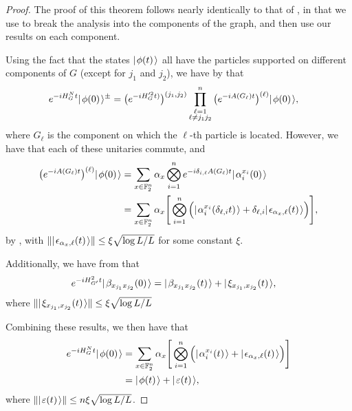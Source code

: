 \documentclass[../thesis-main/thesis-main]{subfiles}
\begin{document}
\begin{proof}
  The proof of this theorem follows nearly identically to that of , in that we use  to break the analysis into the components of the graph, and then use our results on each component.

Using the fact that the states $|\mspace{2mu} \phi(t) \mspace{2mu} \rangle$ all have the particles supported on different components of $G$ (except for $j_1$ and $j_2$), we have  by  that
  \begin{align}
    e^{-i H_G^N t} |\mspace{2mu} \phi(0) \mspace{2mu} \rangle^\pm &= \big( e^{-i H_G'^2 t)}\big)^{(j_1,j_2)}\prod_{\substack{\ell=1\\\ell\neq j_1j_2}}^n \big( e^{-i A(G_\ell)t}\big)^{(\ell)} |\mspace{2mu} \phi(0) \mspace{2mu} \rangle,
  \end{align}
where $G_\ell$ is the component on which the $\ell$-th particle is located.  However, we have that each of these unitaries commute, and
  \begin{align}
    \big( e^{-i A(G_\ell)t}\big)^{(\ell)} |\mspace{2mu} \phi(0) \mspace{2mu} \rangle&= \sum_{x\in \mathbb{F}_2^n} \alpha_x \bigotimes_{i=1}^n e^{- i \delta_{i,\ell} A(G_\ell) t} |\mspace{2mu} \alpha_i^{x_i}(0) \mspace{2mu} \rangle\\
    & = \sum_{x\in \mathbb{F}_2^n} \alpha_x \Bigg[\bigotimes_{i=1}^n \Big(|\mspace{2mu} \alpha_i^{x_i}(\delta_{\ell,i} t) \mspace{2mu} \rangle + \delta_{\ell,i} |\mspace{2mu} \epsilon_{\alpha_x,\ell}(t) \mspace{2mu} \rangle\Big)\Bigg],
  \end{align}
  by , with $\Vert |\mspace{2mu} \epsilon_{\alpha_x,\ell}(t) \mspace{2mu} \rangle\Vert \leq \xi \sqrt{\log L/L}$ for some constant $\xi$.  
  
  Additionally, we have from  that
  \begin{align}
    e^{-i H_{G'}^2 t }|\mspace{2mu} \beta_{x_{j_1}x_{j_2}}(0) \mspace{2mu} \rangle &= |\mspace{2mu} \beta_{x_{j_1}x_{j_2}}(t) \mspace{2mu} \rangle + |\mspace{2mu} \xi_{x_{j_1},x_{j_2}}(t) \mspace{2mu} \rangle,
  \end{align}
  where $\Vert  |\mspace{2mu} \xi_{x_{j_1},x_{j_2}}(t) \mspace{2mu} \rangle\Vert \leq \xi\sqrt{\log L/L}$
  
  
  Combining these results, we then have that
  \begin{align}
    e^{-i H_G^N t} |\mspace{2mu} \phi(0) \mspace{2mu} \rangle &= \sum_{x\in \mathbb{F}_2^n} \alpha_x \Bigg[\bigotimes_{i=1}^n \Big(|\mspace{2mu} \alpha_i^{x_i}(t) \mspace{2mu} \rangle + |\mspace{2mu} \epsilon_{\alpha_x,\ell}(t) \mspace{2mu} \rangle\Big)\Bigg]\\
      &= |\mspace{2mu} \phi(t) \mspace{2mu} \rangle + |\mspace{2mu} \varepsilon(t) \mspace{2mu} \rangle,
  \end{align}
  where $\Vert |\mspace{2mu} \varepsilon(t) \mspace{2mu} \rangle\Vert \leq n \xi \sqrt{\log L/L}$.
\end{proof}
\end{document}
